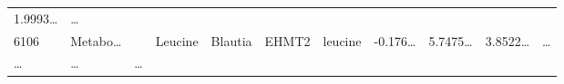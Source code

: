\documentclass[
]{article}
\begin{document}
\begin{longtable}[]{@{}lllllllllll@{}}
\begin{minipage}[t]{0.07\columnwidth}
1.9993\ldots{}\strut
\end{minipage} & \begin{minipage}[t]{0.03\columnwidth}\raggedright
\ldots{}\strut
\end{minipage}\tabularnewline
\begin{minipage}[t]{0.03\columnwidth}\raggedright
6106\strut
\end{minipage} & \begin{minipage}[t]{0.07\columnwidth}\raggedright
Metabo\ldots{}\strut
\end{minipage} & \begin{minipage}[t]{0.07\columnwidth}\raggedright
\strut
\end{minipage} & \begin{minipage}[t]{0.09\columnwidth}\raggedright
Leucine\strut
\end{minipage} & \begin{minipage}[t]{0.07\columnwidth}\raggedright
Blautia\strut
\end{minipage} & \begin{minipage}[t]{0.07\columnwidth}\raggedright
EHMT2\strut
\end{minipage} & \begin{minipage}[t]{0.09\columnwidth}\raggedright
leucine\strut
\end{minipage} & \begin{minipage}[t]{0.07\columnwidth}\raggedright
-0.176\ldots{}\strut
\end{minipage} & \begin{minipage}[t]{0.07\columnwidth}\raggedright
5.7475\ldots{}\strut
\end{minipage} & \begin{minipage}[t]{0.07\columnwidth}\raggedright
3.8522\ldots{}\strut
\end{minipage} & \begin{minipage}[t]{0.03\columnwidth}\raggedright
\ldots{}\strut
\end{minipage}\tabularnewline
\begin{minipage}[t]{0.03\columnwidth}\raggedright
\ldots{}\strut
\end{minipage} & \begin{minipage}[t]{0.07\columnwidth}\raggedright
\ldots{}\strut
\end{minipage} & \begin{minipage}[t]{0.07\columnwidth}\raggedright
\ldots{}\strut
\end{minipage} & \begin{minipage}[t]{0.09\columnwidth}\raggedright

\end{minipage}
\end{longtable}
\end{document}
